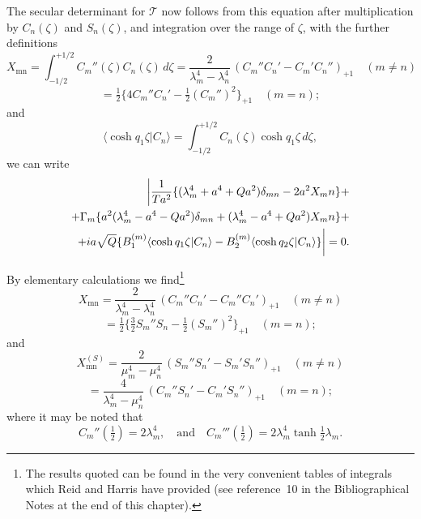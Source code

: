 The secular determinant for $\mathscr{T}$ now follows from this equation after multiplication by $C_n(\zeta)$ and $S_n(\zeta)$, and integration over the range of $\zeta$, with the further definitions
\begin{equation}
X_\mathrm{mn} = \int_{-1/2}^{+1/2} C_m''(\zeta) C_n(\zeta)\, d\zeta = \frac{2}{\lambda_m^4 - \lambda_n^4}\,(C_m'' C_n' - C_m' C_n'')_{+1} \quad (m \ne n) \label{eq:9-232}
\end{equation}
\[
= \tfrac{1}{2}\{4C_m'' C_n' - \tfrac{1}{2}(C_m'')^2\}_{+1} \quad (m = n);
\]
and
\begin{equation}
\langle\cosh q_1\zeta|C_n\rangle = \int_{-1/2}^{+1/2} C_n(\zeta)\cosh q_1\zeta\, d\zeta, \label{eq:9-233}
\end{equation}
we can write
\begin{align}
\bigg|\frac{1}{\mathscr{T} a^2}\{(\lambda_m^4 + a^4 + Qa^2)\delta_{mn} - 2a^2 X_\mathrm{mn}\} + \notag \\
+ \Gamma_m\{a^2(\lambda_m^4 - a^4 - Qa^2)\delta_{mn} + (\lambda_m^4 - a^4 + Qa^2)X_\mathrm{mn}\} + \notag \\
+ ia\sqrt{Q}\{B_1^{(m)}\langle\cosh q_1\zeta|C_n\rangle - B_2^{(m)}\langle\cosh q_2\zeta|C_n\rangle\}\bigg| = 0. \label{eq:9-234}
\end{align}

By elementary calculations we find\footnote{The results quoted can be found in the very convenient tables of integrals which Reid and Harris have provided (see reference~10 in the Bibliographical Notes at the end of this chapter).}
\begin{equation}
X_\mathrm{mn} = \frac{2}{\lambda_m^4 - \lambda_n^4}\,(C_m'' C_n' - C_m'' C_n')_{+1} \quad (m \ne n) \label{eq:9-235}
\end{equation}
\[
= \tfrac{1}{2}\{\tfrac{3}{2}S_m'' S_n - \tfrac{1}{2}(S_m'')^2\}_{+1} \quad (m = n);
\]
and
\begin{equation}
X_\mathrm{mn}^{(S)} = \frac{2}{\mu_m^4 - \mu_n^4}\,(S_m'' S_n' - S_m' S_n'')_{+1} \quad (m \ne n) \label{eq:9-236}
\end{equation}
\[
= \frac{4}{\lambda_m^4 - \mu_n^4}\,(C_m'' S_n' - C_m' S_n'')_{+1} \quad (m = n);
\]
where it may be noted that
\begin{equation}
C_m''(\tfrac{1}{2}) = 2\lambda_m^4, \quad \text{and} \quad C_m'''(\tfrac{1}{2}) = 2\lambda_m^4 \tanh\tfrac{1}{2}\lambda_m. \label{eq:9-237}
\end{equation}

